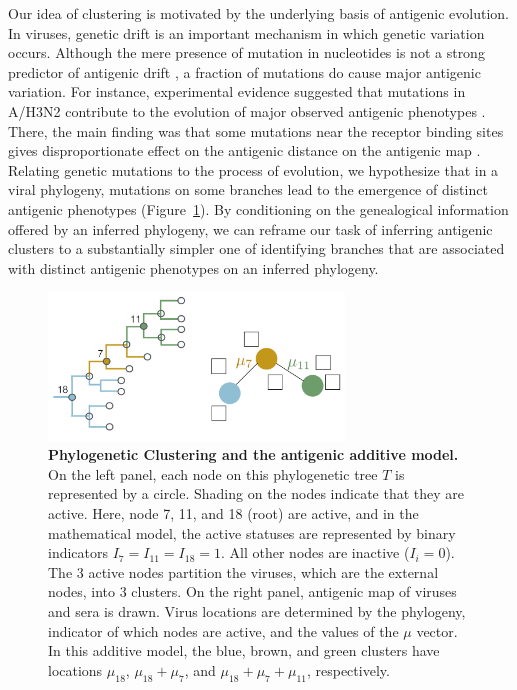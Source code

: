 \documentclass[11pt,oneside,letterpaper]{article}
\begin{document}
Our idea of clustering is motivated by the underlying basis of antigenic evolution.  
In viruses, genetic drift is an important mechanism in which genetic variation occurs. 
Although the mere presence of mutation in nucleotides is not a strong predictor of antigenic drift \cite{smith_mapping_2004}, a fraction of mutations do cause major antigenic variation. 
For instance, experimental evidence suggested that mutations in A/H3N2 contribute to the evolution of major observed antigenic phenotypes \cite{koel_substitutions_2013}.
There, the main finding was that some mutations near the receptor binding sites gives disproportionate effect on the antigenic distance on the antigenic map \cite{koel_substitutions_2013}. 
Relating genetic mutations to the process of evolution, we hypothesize that in a viral phylogeny, mutations on some branches lead to the emergence of distinct antigenic phenotypes (Figure~\ref{additiveModel}).  
By conditioning on the genealogical information offered by an inferred phylogeny, we can reframe our task of inferring antigenic clusters to a substantially simpler one of identifying branches that are associated with distinct antigenic phenotypes on an inferred phylogeny.
	

\begin{figure}[h]
	\centering		
	\includegraphics[width=0.7\textwidth]{figures/lineArt/schematicDiagram}
	\caption{\textbf{Phylogenetic Clustering and the antigenic additive model.} 
On the left panel, each node on this phylogenetic tree $T$ is represented by a circle. 
Shading on the nodes indicate that they are active.
Here, node 7, 11, and 18 (root) are active, and in the mathematical model, the active statuses are represented by binary indicators $I_{7}=I_{11}=I_{18} = 1$. 
All other nodes are inactive ($I_i=0$). 
The 3 active nodes partition the viruses, which are the external nodes, into 3 clusters.
On the right panel, antigenic map of viruses and sera is drawn.
Virus locations are determined by the phylogeny, indicator of which nodes are active, and the values of the $\mu$ vector.
In this additive model, the blue, brown, and green clusters have locations $\mu_{18}$, $\mu_{18} + \mu_7$, and $\mu_{18}+ \mu_7 + \mu_{11}$, respectively.
	} 
	\label{additiveModel} 
\end{figure}
\end{document}
